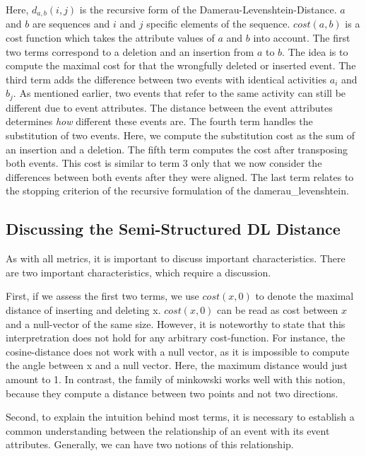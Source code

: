 \documentclass[./../../paper.tex]{subfiles}
\begin{document}
\noindent Here, $d_{a, b}(i, j)$ is the recursive form of the Damerau-Levenshtein-Distance. $a$ and $b$ are sequences and $i$ and $j$ specific elements of the sequence. $cost(a,b)$ is a cost function which takes the attribute values of $a$ and $b$ into account. 
The first two terms correspond to a deletion and an insertion from $a$ to $b$. The idea is to compute the maximal cost for that the wrongfully deleted or inserted event. 
The third term adds the difference between two events with identical activities $a_i$ and $b_j$. As mentioned earlier, two events that refer to the same activity can still be different due to event attributes. The distance between the event attributes determines \emph{how} different these events are. 
The fourth term handles the substitution of two events. Here, we compute the substitution cost as the sum of an insertion and a deletion. 
The fifth term computes the cost after transposing both events. This cost is similar to term 3 only that we now consider the differences between both events after they were aligned. The last term relates to the stopping criterion of the recursive formulation of the \gls{damerau_levenshtein}.  


\subsection{Discussing the Semi-Structured DL Distance}
As with all metrics, it is important to discuss important characteristics. There are two important characteristics, which require a discussion.

First, if we assess the first two terms, we use $cost(x,0)$ to denote the maximal distance of inserting and deleting x. $cost(x,0)$ can be read as cost between $x$ and a null-vector of the same size. However, it is noteworthy to state that this interpretration does not hold for any arbitrary cost-function. For instance, the cosine-distance does not work with a null vector, as it is impossible to compute the angle between x and a null vector. Here, the maximum distance would just amount to 1. In contrast, the family of \Gls{minkowski} works well with this notion, because they compute a distance between two points and not two directions. 

Second, to explain the intuition behind most terms, it is necessary to establish a common understanding between the relationship of an event with its event attributes. Generally, we can have two notions of this relationship. 
\end{document}
